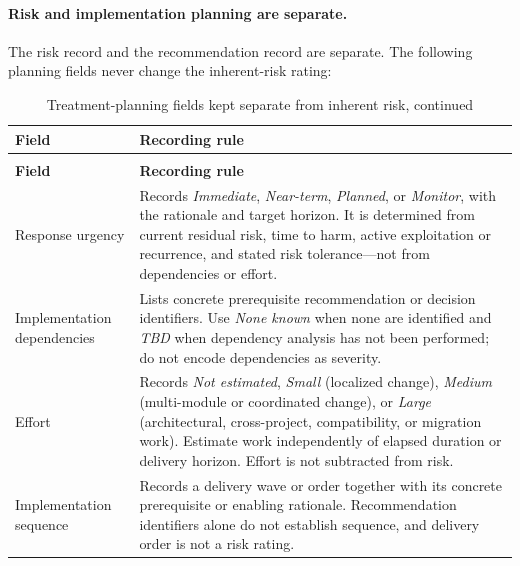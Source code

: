 \documentclass[../main.tex]{subfiles}
\begin{document}
\paragraph{Risk and implementation planning are separate.}
The risk record and the recommendation record are separate. The following
planning fields never change the inherent-risk rating:


\begingroup
\small
\setlength{\tabcolsep}{3pt}
\renewcommand{\arraystretch}{1.15}

\setlength{\LTleft}{-0.7in}
\setlength{\LTright}{-0.7in}

\begin{longtable}{@{}>{\raggedright\arraybackslash}p{0.25\widetablewidth}p{0.68\widetablewidth}@{}}
\caption{Treatment-planning fields kept separate from inherent risk}
\label{tab:treatment-planning-fields}\\
\hline
\textbf{Field} & \textbf{Recording rule} \\
\hline
\endfirsthead

\caption[]{Treatment-planning fields kept separate from inherent risk,
continued}\\
\hline
\textbf{Field} & \textbf{Recording rule} \\
\hline
\endhead

\hline
\endfoot

\hline
\endlastfoot

Response urgency &
Records \emph{Immediate}, \emph{Near-term}, \emph{Planned}, or
\emph{Monitor}, with the rationale and target horizon. It is determined
from current residual risk, time to harm, active exploitation or recurrence,
and stated risk tolerance---not from dependencies or effort. \\

Implementation dependencies &
Lists concrete prerequisite recommendation or decision identifiers. Use
\emph{None known} when none are identified and \emph{TBD} when dependency
analysis has not been performed; do not encode dependencies as severity. \\

Effort &
Records \emph{Not estimated}, \emph{Small} (localized change), \emph{Medium}
(multi-module or coordinated change), or \emph{Large} (architectural,
cross-project, compatibility, or migration work). Estimate work independently
of elapsed duration or delivery horizon. Effort is not subtracted from risk. \\

Implementation sequence &
Records a delivery wave or order together with its concrete prerequisite or
enabling rationale. Recommendation identifiers alone do not establish sequence,
and delivery order is not a risk rating. \\


\end{longtable}
\end{document}
